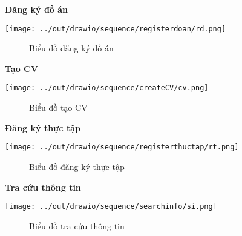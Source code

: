   \textbf{Đăng ký đồ án}
    \begin{center}
      \texttt{[image: ../out/drawio/sequence/registerdoan/rd.png]}
      \begin{figure}[h]
        \centering
        \caption{Biểu đồ đăng ký đồ án}
      \end{figure}
    \end{center}

  \textbf{Tạo CV}
    \begin{center}
      \texttt{[image: ../out/drawio/sequence/createCV/cv.png]}
      \begin{figure}[h]
        \centering
        \caption{Biểu đồ tạo CV}
      \end{figure}
    \end{center}

  \textbf{Đăng ký thực tập}
    \begin{center}
      \texttt{[image: ../out/drawio/sequence/registerthuctap/rt.png]}
      \begin{figure}[h]
        \centering
        \caption{Biểu đồ đăng ký thực tập}
      \end{figure}
    \end{center}

  \textbf{Tra cứu thông tin}
    \begin{center}
      \texttt{[image: ../out/drawio/sequence/searchinfo/si.png]}
      \begin{figure}[h]
        \centering
        \caption{Biểu đồ tra cứu thông tin}
      \end{figure}
    \end{center}

